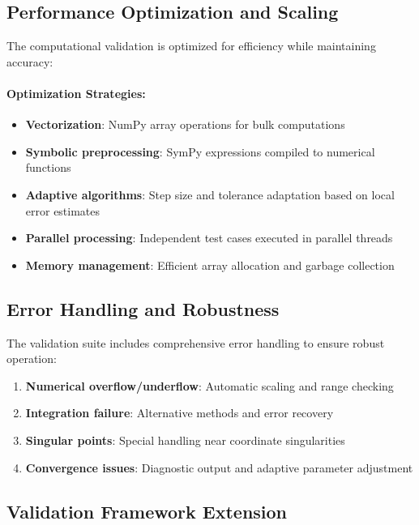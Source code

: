 \subsection{Performance Optimization and Scaling}
\label{subsec:performance_optimization}

The computational validation is optimized for efficiency while maintaining accuracy:

\paragraph{Optimization Strategies:}
\begin{itemize}
\item \textbf{Vectorization}: NumPy array operations for bulk computations
\item \textbf{Symbolic preprocessing}: SymPy expressions compiled to numerical functions
\item \textbf{Adaptive algorithms}: Step size and tolerance adaptation based on local error estimates
\item \textbf{Parallel processing}: Independent test cases executed in parallel threads
\item \textbf{Memory management}: Efficient array allocation and garbage collection
\end{itemize}

\subsection{Error Handling and Robustness}
\label{subsec:error_handling}

The validation suite includes comprehensive error handling to ensure robust operation:

\begin{enumerate}
\item \textbf{Numerical overflow/underflow}: Automatic scaling and range checking
\item \textbf{Integration failure}: Alternative methods and error recovery
\item \textbf{Singular points}: Special handling near coordinate singularities
\item \textbf{Convergence issues}: Diagnostic output and adaptive parameter adjustment
\end{enumerate}

\subsection{Validation Framework Extension}
\label{subsec:framework_extension}

